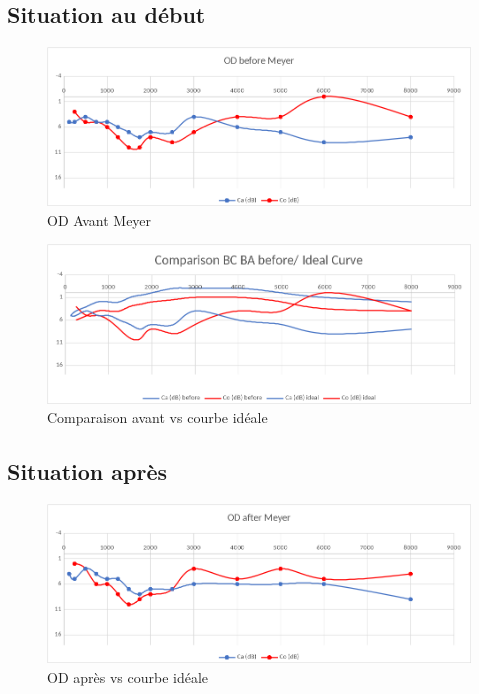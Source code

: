 \begin{enumerate}
 	\lipsum[1]
 	
 	\subsection{Situation au début}
 	
 	\lipsum[1]
 	
 	\begin{figure}[tbh]
 		\centering
 		\includegraphics[width=0.7\linewidth]{images/clinique/od_before_meyer.png}
 		\caption{OD Avant Meyer}
 		\label{fig:odbeforemeyer}
 	\end{figure}
 	
 	\lipsum[1]
 	
 	
 	
 	
 	\begin{figure}
 		\centering
 		\includegraphics[width=0.7\linewidth]{images/clinique/comparison_bc_ba_before_vs_ideal_curve_meyer.png}
 		\caption[Avant vs courbe idéale]{Comparaison avant vs courbe idéale}
 		\label{fig:comparisonbcbabeforevsidealcurvemeyer}
 	\end{figure}
 	
 	
 	\subsection{Situation après}
 	\lipsum[1]
 	\begin{figure}[h]
 		\centering
 		\includegraphics[width=0.7\linewidth]{images/clinique/od_after_meyer.png}
 		\caption{OD après vs courbe idéale}
 		\label{fig:odaftermeyer}
 	\end{figure}
 

\end{enumerate}
